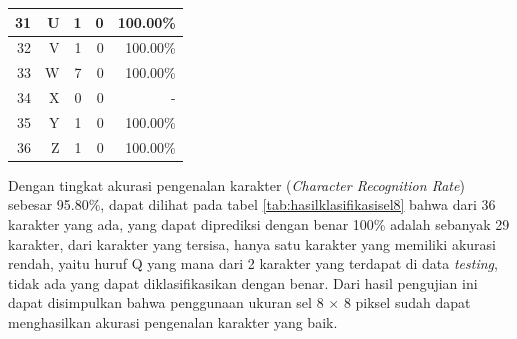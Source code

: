 \begin{longtable}[c]{|r|r|r|r|r|}
	31           & U                 & 1                       & 0                       &100.00\%            \\ \hline
	32           & V                 & 1                       & 0                       &100.00\%            \\ \hline
	33           & W                 & 7                       & 0                       &100.00\%            \\ \hline
	34           & X                 & 0                       & 0                       & -            \\ \hline
	35           & Y                 & 1                       & 0                       &100.00\%            \\ \hline
	36           & Z                 & 1                       & 0                       &100.00\%            \\ \hline
\end{longtable}

\noindent Dengan tingkat akurasi pengenalan karakter (\textit{Character Recognition Rate}) sebesar 95.80\%, dapat dilihat pada tabel \ref{tab:hasilklasifikasisel8} bahwa dari 36  karakter yang ada, yang dapat diprediksi dengan benar 100\% adalah sebanyak 29 karakter, dari karakter yang  tersisa, hanya satu karakter yang memiliki akurasi rendah, yaitu huruf Q yang mana dari 2 karakter yang terdapat di data \textit{testing}, tidak ada yang dapat diklasifikasikan dengan benar. Dari hasil pengujian ini dapat  disimpulkan bahwa penggunaan ukuran sel 8 $\times$ 8 piksel sudah dapat menghasilkan akurasi pengenalan karakter yang baik.\\

